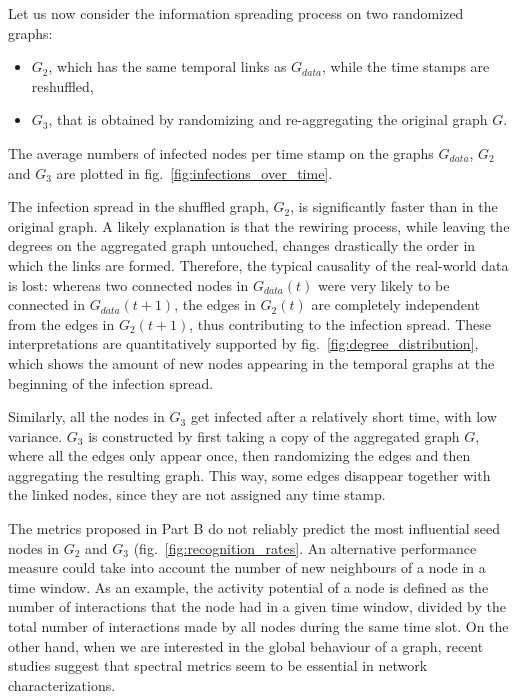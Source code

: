 \documentclass[letterpaper]{article}
\begin{document}
\noindent Let us now consider the information spreading process on two randomized graphs:
\begin{itemize}
\item \(G_2\), which has the same temporal links as \(G_{data}\), while the time stamps are reshuffled,
\item \(G_3\), that is obtained by randomizing and re-aggregating the original graph \(G\).
\end{itemize}

\noindent The average numbers of infected nodes per time stamp on the graphs \(G_{data}\), \(G_2\) and \(G_3\) are plotted in fig.~\ref{fig:infections_over_time}. 

\noindent The infection spread in the shuffled graph, \(G_2\), is significantly faster than in the original graph. A likely explanation is that the rewiring process, while leaving the degrees on the aggregated graph untouched, changes drastically the order in which the links are formed. Therefore, the typical causality of the real-world data is lost: whereas two connected nodes in \(G_{data}(t)\) were very likely to be connected in \(G_{data}(t+1)\), the edges in \(G_2(t)\) are completely independent from the edges in \(G_2(t+1)\), thus contributing to the infection spread.
These interpretations are quantitatively supported by fig.~\ref{fig:degree_distribution}, which shows the amount of new nodes appearing in the temporal graphs at the beginning of the infection spread. 

Similarly, all the nodes in \(G_3\) get infected after a relatively short time, with low variance.
\(G_3\) is constructed by first taking a copy of the aggregated graph \(G\), where all the edges only appear once, then randomizing the edges and then aggregating the resulting graph. This way, some edges disappear together with the linked nodes, since they are not assigned any time stamp.

The metrics proposed in Part B do not reliably predict the most influential seed nodes in \(G_2\) and \(G_3\) (fig.~\ref{fig:recognition_rates}. An alternative performance measure could take into account the number of new neighbours of a node in a time window. As an example, the activity potential of a node is defined as the number of interactions that the node had in a given time window, divided by the total number of interactions made by all nodes during the same time slot.
On the other hand, when we are interested in the global behaviour of a graph, recent studies suggest that spectral metrics seem to be essential in network characterizations. 
\end{document}
